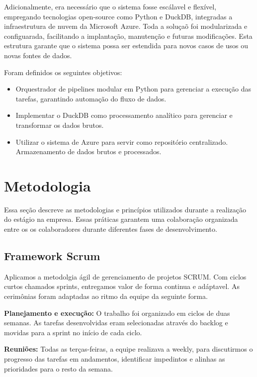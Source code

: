 Adicionalmente, era necessário que o sistema fosse escálavel e flexível, empregando tecnologias open-source como Python e DuckDB, integradas a infraestrutura de nuvem da Microsoft Azure. Toda a soluçaõ foi modularizada e configuarada, facilitando a implantação, manutenção e futuras modificações. Esta estrutura garante que o sistema possa ser estendida para novos casos de usos ou novas fontes de dados.

Foram definidos os seguintes objetivos:

\begin{itemize}
    \item Orquestrador de pipelines modular em Python para gerenciar a execução das tarefas, garantindo automação do fluxo de dados.
    \item Implementar o DuckDB como processamento analítico para gerenciar e transformar os dados brutos.
    \item Utilizar o sistema de Azure para servir como repositório centralizado. Armazenamento de dados brutos e processados.
\end{itemize}

\section{Metodologia}

Essa seção descreve as metodologias e princípios utilizados durante a realização do estágio na empresa. Essas práticas garantem uma colaboração organizada entre os os colaboradores durante diferentes fases de desenvolvimento.

\subsection{Framework Scrum}

Aplicamos a metodolgia ágil de gerenciamento de projetos SCRUM. Com ciclos curtos chamados sprints, entregamos valor de forma continua e adáptavel. As cerimônias foram adaptadas ao ritmo da equipe da seguinte forma.

\textbf{Planejamento e execução:} O trabalho foi organizado em ciclos de duas semanas. As tarefas desenvolvidas eram selecionadas através do backlog e movidas para a sprint no início de cada ciclo.

\textbf{Reuniões:} Todas as terças-feiras, a equipe realizava a weekly, para discutirmos o progresso das tarefas em andamentos, identificar impedintos e alinhas as prioridades para o resto da semana.

